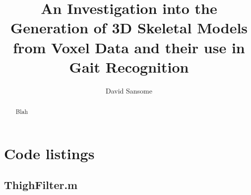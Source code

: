 \documentclass[a4paper,10pt]{article}
\title{An Investigation into the Generation of 3D Skeletal Models from Voxel Data and their use in Gait Recognition}
\author{David Sansome}
\begin{document}


\maketitle

\bigskip
\begin{abstract}
	Blah
\end{abstract}

\newpage

\tableofcontents





\newpage


\appendix

\section{Code listings}

\subsection{ThighFilter.m}
\lstset{language=Matlab}

\end{document}
